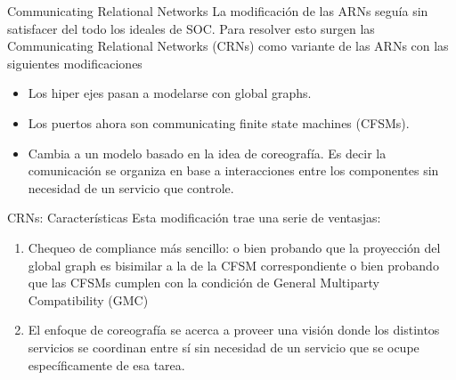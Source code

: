 \documentclass[10pt,xcolor={table,dvipsnames},t]{beamer}
\begin{document}
\begin{frame}{Communicating Relational Networks}
   La modificación de las ARNs seguía sin satisfacer del todo los ideales de SOC. Para resolver esto surgen las Communicating Relational Networks (CRNs) como variante de las ARNs con las siguientes modificaciones
    \begin{itemize}
        \item Los hiper ejes pasan a modelarse con global graphs.
        \item Los puertos ahora son communicating finite state machines (CFSMs).
        \item Cambia a un modelo basado en la idea de coreografía. Es decir la comunicación se organiza en base a interacciones entre los componentes sin necesidad de un servicio que controle.
    \end{itemize}
\end{frame}

\begin{frame}{CRNs: Características}
Esta modificación trae una serie de ventasjas:
\begin{enumerate}
    \item Chequeo de compliance más sencillo: o bien probando que la proyección del global graph es bisimilar a la de la CFSM correspondiente o bien probando que las CFSMs cumplen con la condición de General Multiparty Compatibility (GMC)
    \item El enfoque de coreografía se acerca a proveer una visión donde los distintos servicios se coordinan entre sí sin necesidad de un servicio que se ocupe específicamente de esa tarea.
\end{enumerate}
\end{frame}
\end{document}
